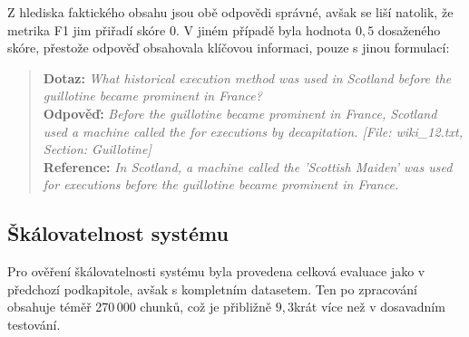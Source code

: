 \noindent Z hlediska faktického obsahu jsou obě odpovědi správné, avšak se liší natolik, že metrika F1 jim přiřadí skóre $0$. V jiném případě byla hodnota $0{,}5$ dosaženého skóre, přestože odpověď obsahovala klíčovou informaci, pouze s jinou formulací:

\begin{quote}
\textbf{Dotaz:} \textit{What historical execution method was used in Scotland before the guillotine became prominent in France?} \\
\textbf{Odpověď:} \textit{Before the guillotine became prominent in France, Scotland used a machine called the  for executions by decapitation. [File: wiki\_12.txt, Section: Guillotine]} \\
\textbf{Reference:} \textit{In Scotland, a machine called the 'Scottish Maiden' was used for executions before the guillotine became prominent in France.} 
\end{quote}



\subsection{Škálovatelnost systému}
Pro ověření škálovatelnosti systému byla provedena celková evaluace jako v předchozí podkapitole, avšak s kompletním datasetem. Ten po zpracování obsahuje téměř 270\,000 chunků, což je přibližně $9{,}3$krát více než v dosavadním testování.

